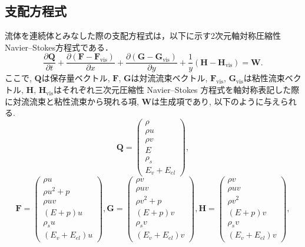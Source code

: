 \subsection{支配方程式}
流体を連続体とみなした際の支配方程式は，以下に示す2次元軸対称圧縮性Navier–Stokes方程式である．
\begin{equation}
   \dfrac{\partial {\bm Q}}{\partial t}
  +\dfrac{\partial ({\bm F}-{\bm F}_\mathrm{vis})}{\partial x}
  +\dfrac{\partial ({\bm G}-{\bm G}_\mathrm{vis})}{\partial y}
  +\dfrac{1}{y}({\bm H}-{\bm H}_\mathrm{vis})
  ={\bm W}.
  \label{tab:goveq}
\end{equation}
ここで,
${\bm Q}$は保存量ベクトル,
${\bm F}$, ${\bm G}$は対流流束ベクトル,
${\bm F}_\mathrm{vis}$, ${\bm G}_\mathrm{vis}$は粘性流束ベクトル,
${\bm H}$, ${\bm H}_\mathrm{vis}$はそれぞれ三次元圧縮性 Navier–Stokes 方程式を軸対称表記した際に対流流束と粘性流束から現れる項,
${\bm W}$は生成項であり,
以下のように与えられる.
\begin{equation}
  {\bm Q}=
  \begin{pmatrix}
  \rho\\
  \rho u\\
  \rho v\\
  E\\
  \rho_s\\
  E_{v}+E_{el}
  \end{pmatrix},
\end{equation}
%
\begin{equation}
  {\bm F}=
  \begin{pmatrix}
  \rho u\\
  \rho u^2+p\\
  \rho u v\\
  (E+p) u\\
  \rho_s u\\
  \left(E_{v}+E_{el}\right)u
  \end{pmatrix},
  {\bm G}=
  \begin{pmatrix}
  \rho v\\
  \rho u v\\
  \rho v^2+p\\
  (E+p) v\\
  \rho_s v\\
  (E_{v}+E_{el})v
  \end{pmatrix},
  {\bm H}=
  \begin{pmatrix}
  \rho v\\
  \rho u v\\
  \rho v^2\\
  (E+p) v\\
  \rho_s v\\
  (E_{v}+E_{el})v  
  \end{pmatrix},
\end{equation}
